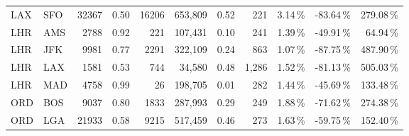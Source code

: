 \begin{landscape}
\begin{center}
\begin{tabular}{l l | r r r r r r r r r}
LAX  &  SFO  &  32367  &  0.50  &  16206  &  653,809  &  0.52  &  221  &  3.14\,\%  &  -83.64\,\%  &  279.08\,\% \\
LHR  &  AMS  &  2788  &  0.92  &  221  &  107,431  &  0.10  &  241  &  1.39\,\%  &  -49.91\,\%  &  64.94\,\% \\
LHR  &  JFK  &  9981  &  0.77  &  2291  &  322,109  &  0.24  &  863  &  1.07\,\%  &  -87.75\,\%  &  487.90\,\% \\
LHR  &  LAX  &  1581  &  0.53  &  744  &  34,580  &  0.48  &  1,286  &  1.52\,\%  &  -81.13\,\%  &  505.03\,\% \\
LHR  &  MAD  &  4758  &  0.99  &  26  &  198,705  &  0.01  &  282  &  1.44\,\%  &  -45.69\,\%  &  133.48\,\% \\
ORD  &  BOS  &  9037  &  0.80  &  1833  &  287,993  &  0.29  &  249  &  1.88\,\%  &  -71.62\,\%  &  274.38\,\% \\
ORD  &  LGA  &  21933  &  0.58  &  9215  &  517,459  &  0.46  &  273  &  1.63\,\%  &  -59.75\,\%  &  152.40\,\% \\
\end{tabular}
\end{center}
\end{landscape}
